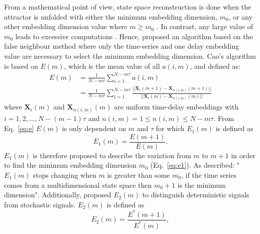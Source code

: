 From a mathematical point of view, state space reconstruction is done when 
the attractor is unfolded with either the minimum embedding dimension, $m_0$, 
or any other embedding dimension value where $m \ge m_0$ \citep{kennel1992}.
In contrast, any large value of $m_0$ leads to excessive computations 
\citep{bradley2015}. Hence, \cite{Cao1997} proposed an algorithm based on the
false neighbour method where only the time-series and one delay embedding value 
are necessary to select the minimum embedding dimension. 
Cao's algorithm is based on $E(m)$, which is the mean value of all $a(i,m)$,
and defined as: 
\begin{equation}\label{eq:e}
  \begin{aligned}
E(m) &= \frac{1}{N-m\tau} \sum_{i=1}^{N-m\tau} a(i,m) \\
    &=
       \frac{1}{N-m\tau} \sum_{i=1}^{N-m\tau}
       \frac{ || \boldsymbol{X}_i(m+1) - \boldsymbol{X}_{n(i,m)}(m+1) || }
            { || \boldsymbol{X}_i(m) - \boldsymbol{X}_{n(i,m)}(m) ||  }
  \end{aligned}
\end{equation}
where $\boldsymbol{X}_i(m)$ and $\boldsymbol{X}_{n(i,m)}(m)$ are uniform time-delay
embeddings with $i=1,2,\dots,N-(m-1)\tau$ and 
$ n(i,m)= 1 \le n(i,m) \le N-m\tau$.
From Eq.~\ref{eq:e} $E(m)$ is only dependent on $m$ and $\tau$ for which 
$E_1(m)$ is defined as
\begin{equation}\label{eq:e1}
E_1(m) = \frac{ E(m+1) } { E(m)}.
\end{equation}
$E_1(m)$ is therefore proposed to describe the variation from $m$ to $m+1$
in order to find the minimum embedding dimension $m_0$ (Eq.~\ref{eq:e1}).
As \citealt[p. 44]{Cao1997} described: "$E_1(m)$ stops changing when $m$ is 
greater than some $m_0$, if the time series comes from a multidimensional 
state space then $m_0 + 1$ is the minimum dimension".
Additionally, \cite{Cao1997} proposed $E_2(m)$ to distinguish deterministic 
signals from stochastic signals. $E_2(m)$ is defined as
\begin{equation}\label{eq:e2}
E_2(m) = \frac{ E^* (m+1) } { E^*(m)},
\end{equation}
